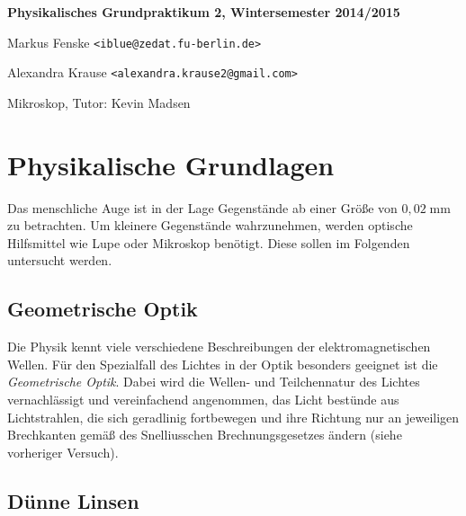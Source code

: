 \documentclass[a4paper,german,12pt,smallheadings]{scrartcl}
\begin{document}
\begin{titlepage}

\end{titlepage}

\allowdisplaybreaks %
\begin{center}
\bfseries %
\sffamily %
\vspace{-40pt}
Physikalisches Grundpraktikum 2, Wintersemester 2014/2015

Markus Fenske \texttt{<iblue@zedat.fu-berlin.de>}

Alexandra Krause \texttt{<alexandra.krause2@gmail.com>}

Mikroskop, Tutor: Kevin Madsen
\vspace{-10pt}
\end{center}

\section{Physikalische Grundlagen}

Das menschliche Auge ist in der Lage Gegenstände ab einer Größe von $0{,}02
\operatorname{mm}$ zu betrachten. Um kleinere Gegenstände wahrzunehmen, werden
optische Hilfsmittel wie Lupe oder Mikroskop benötigt. Diese sollen im
Folgenden untersucht werden.

\subsection{Geometrische Optik}

Die Physik kennt viele verschiedene Beschreibungen der elektromagnetischen
Wellen. Für den Spezialfall des Lichtes in der Optik besonders geeignet ist die
\textit{Geometrische Optik}. Dabei wird die Wellen- und Teilchennatur des
Lichtes vernachlässigt und vereinfachend angenommen, das Licht bestünde aus
Lichtstrahlen, die sich geradlinig fortbewegen und ihre Richtung nur an
jeweiligen Brechkanten gemäß des Snelliusschen Brechnungsgesetzes ändern (siehe
vorheriger Versuch).

\subsection{Dünne Linsen}
\end{document}
